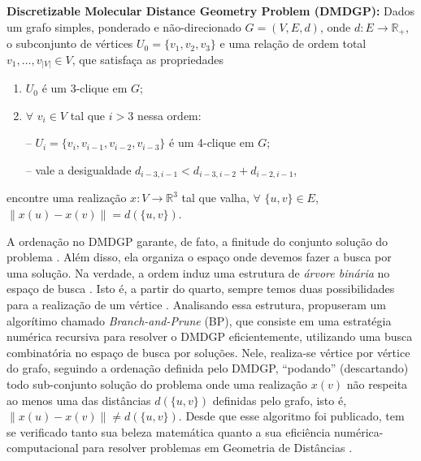 \documentclass[a4,11pt]{pssbmac}
\begin{document}
	\vspace{0.15cm}
	\textbf{Discretizable Molecular Distance Geometry Problem (DMDGP): }Dados um grafo simples, ponderado e não-direcionado $G = (V,E,d)$, onde $d: E \rightarrow \mathbb{R}_{+}$, o subconjunto de vértices $U_{0} = \{v_{1},v_{2},v_{3} \}$ e uma relação de ordem total $v_1, \dots, v_{|V|} \in V$, que satisfaça as propriedades
	\begin{enumerate}
		\item $U_{0}$ é um 3-clique em $G$;
		\vspace{-0.6cm}
		\item 
		\begin{minipage}{0.4\linewidth}  
			$\forall$ $v_{i} \in V$ tal que $i > 3$ nessa ordem:
		\end{minipage}
		\begin{minipage}{0.6\linewidth}
			\vspace{0.6cm}
			-- $U_{i} = \{v_i, v_{i-1}, v_{i-2}, v_{i-3}\}$ é um 4-clique em $G$;
			\vspace{0.2cm}
						
			-- vale a desigualdade $d_{i-3,i-1} < d_{i-3,i-2} + d_{i-2,i-1}$,
		\end{minipage}
		
	\end{enumerate}
	encontre uma realização $x: V \rightarrow \mathbb{R}^{3}$ tal que valha, $\forall$ $\{u,v\} \in E$, $\left\| x(u) - x(v) \right\| = d(\{u,v\})$.
	\vspace{0.15cm}
	
	A ordenação no DMDGP garante, de fato, a finitude do conjunto solução do problema \cite{carlileBook31Coloquio}. Além disso, ela organiza o espaço onde devemos fazer a busca por uma solução. Na verdade, a ordem induz uma estrutura de \textit{árvore binária} no espaço de busca \cite{fidalgotese}. Isto é, a partir do quarto, sempre temos duas possibilidades para a realização de um vértice \cite{carlileGDandAplications}. Analisando essa estrutura, propuseram um algorítimo chamado \textit{Branch-and-Prune} (BP), que consiste em uma estratégia numérica recursiva para resolver o DMDGP eficientemente, utilizando uma busca combinatória no espaço de busca por soluções. Nele, realiza-se vértice por vértice do grafo, seguindo a ordenação definida pelo DMDGP, ``podando'' (descartando) todo sub-conjunto solução do problema onde uma realização $x(v)$ não respeita ao menos uma das distâncias $d(\{u,v\})$ definidas pelo grafo, isto é, $\left\| x(u) - x(v) \right\| \neq d(\{u,v\})$. Desde que esse algoritmo foi publicado, tem se verificado tanto sua beleza matemática quanto a sua eficiência numérica-computacional para resolver problemas em Geometria de Distâncias \cite{fidalgotese}. 
	
\end{document}
